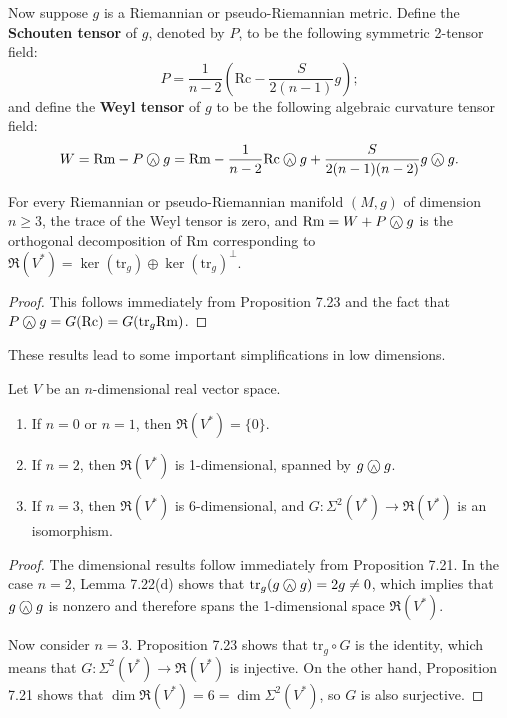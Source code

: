 Now suppose $g$ is a Riemannian or pseudo-Riemannian metric. Define the \textbf{Schouten tensor} of $g$, denoted by $P$, to be the following symmetric 2-tensor field:
\[
P = \frac{1}{n-2} \left( \text{Rc} - \frac{S}{2(n-1)} g \right);
\]
and define the \textbf{Weyl tensor} of $g$ to be the following algebraic curvature tensor field:
\[
W = \text{Rm} - P \owedge g
= \text{Rm} - \frac{1}{n-2} \text{Rc} \owedge g + \frac{S}{2(n-1)(n-2)} g \owedge g.
\]

\begin{proposition}
\label{prop:weyl-decomposition}
For every Riemannian or pseudo-Riemannian manifold $(M, g)$ of dimension $n \geq 3$, the trace of the Weyl tensor is zero, and $\text{Rm} = W + P \owedge g$ is the orthogonal decomposition of $\text{Rm}$ corresponding to $\mathfrak{R}(V^*) = \ker(\text{tr}_g) \oplus \ker(\text{tr}_g)^{\perp}$.
\end{proposition}

\begin{proof}
This follows immediately from Proposition 7.23 and the fact that $P \owedge g = G(\text{Rc}) = G(\text{tr}_g \text{Rm})$.
\end{proof}

These results lead to some important simplifications in low dimensions.

\begin{corollary}
\label{cor:curvature-space-dimensions}
Let $V$ be an $n$-dimensional real vector space.
\begin{enumerate}
\item[(a)] If $n = 0$ or $n = 1$, then $\mathfrak{R}(V^*) = \{0\}$.
\item[(b)] If $n = 2$, then $\mathfrak{R}(V^*)$ is 1-dimensional, spanned by $g \owedge g$.
\item[(c)] If $n = 3$, then $\mathfrak{R}(V^*)$ is 6-dimensional, and $G: \Sigma^2(V^*) \to \mathfrak{R}(V^*)$ is an isomorphism.
\end{enumerate}
\end{corollary}

\begin{proof}
The dimensional results follow immediately from Proposition 7.21. In the case $n = 2$, Lemma 7.22(d) shows that $\text{tr}_g (g \owedge g) = 2g \neq 0$, which implies that $g \owedge g$ is nonzero and therefore spans the 1-dimensional space $\mathfrak{R}(V^*)$.

Now consider $n = 3$. Proposition 7.23 shows that $\text{tr}_g \circ G$ is the identity, which means that $G: \Sigma^2(V^*) \to \mathfrak{R}(V^*)$ is injective. On the other hand, Proposition 7.21 shows that $\dim \mathfrak{R}(V^*) = 6 = \dim \Sigma^2(V^*)$, so $G$ is also surjective.
\end{proof}

